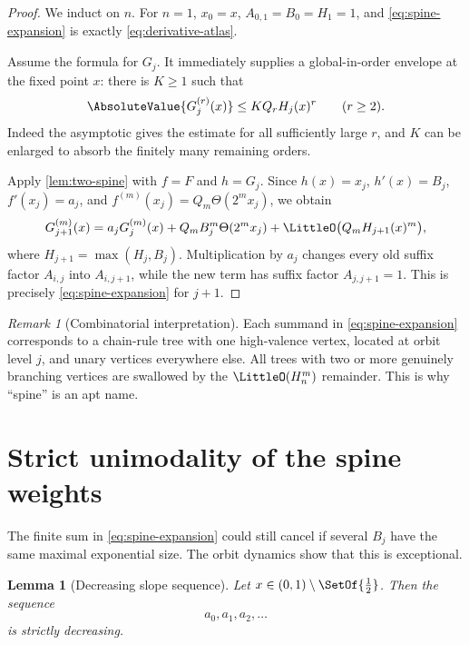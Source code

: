 \documentclass[11pt,oneside]{article}
\newtheorem{lemma}[theorem]{Lemma}
\theoremstyle{definition}
\theoremstyle{remark}
\newtheorem{remark}[theorem]{Remark}
\newcommand{\ThetaF}{\Theta}
\newcommand{\half}{\tfrac12}
\begin{document}
\begin{proof}
We induct on $n$.  For $n=1$, $x_0=x$, $A_{0,1}=B_0=H_1=1$, and
\eqref{eq:spine-expansion} is exactly \eqref{eq:derivative-atlas}.

Assume the formula for $G_j$.  It immediately supplies a global-in-order envelope at
the fixed point $x$: there is $K\geq1$ such that
\begin{equation}
 \AbsoluteValue{G_j^{(r)}(x)}\leq KQ_rH_j(x)^r\qquad(r\geq2).
 \label{eq:Gj-envelope}
\end{equation}
Indeed the asymptotic gives the estimate for all sufficiently large $r$, and $K$ can
be enlarged to absorb the finitely many remaining orders.

Apply \cref{lem:two-spine} with $f=F$ and $h=G_j$.  Since
$h(x)=x_j$, $h'(x)=B_j$, $f'(x_j)=a_j$, and
$f^{(m)}(x_j)=Q_m\ThetaF(2^m x_j)$, we obtain
\begin{equation}
 G_{j+1}^{(m)}(x)
 =a_jG_j^{(m)}(x)
  +Q_mB_j^m\ThetaF(2^m x_j)
  +\LittleO\bigl(Q_mH_{j+1}(x)^m\bigr),
 \label{eq:spine-induction-step}
\end{equation}
where $H_{j+1}=\max(H_j,B_j)$.  Multiplication by $a_j$ changes every old suffix
factor $A_{i,j}$ into $A_{i,j+1}$, while the new term has suffix factor
$A_{j,j+1}=1$.  This is precisely \eqref{eq:spine-expansion} for $j+1$.
\end{proof}

\begin{remark}[Combinatorial interpretation]
Each summand in \eqref{eq:spine-expansion} corresponds to a chain-rule tree with one
high-valence vertex, located at orbit level $j$, and unary vertices everywhere else.
All trees with two or more genuinely branching vertices are swallowed by the
$\LittleO(H_n^m)$ remainder.  This is why ``spine'' is an apt name.
\end{remark}

\section{Strict unimodality of the spine weights}
\label{sec:unimodality}

The finite sum in \eqref{eq:spine-expansion} could still cancel if several $B_j$ have
the same maximal exponential size.  The orbit dynamics show that this is exceptional.

\begin{lemma}[Decreasing slope sequence]
\label{lem:decreasing-slopes}
Let $x\in(0,1)\setminus\SetOf{\half}$.  Then the sequence
\begin{equation}
 a_0,a_1,a_2,\ldots
 \label{eq:a-decreasing}
\end{equation}
is strictly decreasing.
\end{lemma}
\end{document}
